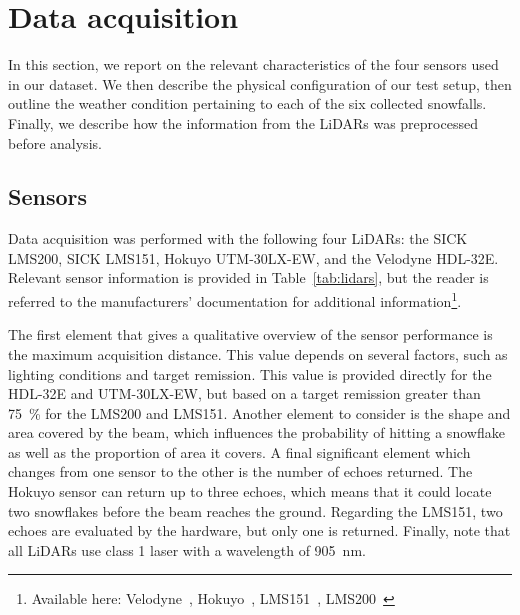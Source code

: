 \section{Data acquisition}
\label{sec:chap_lidar_data_acquisition}

In this section, we report on the relevant characteristics of the four sensors used in our dataset. We then describe the physical configuration of our test setup, then outline the weather condition pertaining to each of the six collected snowfalls. Finally, we describe how the information from the LiDARs was preprocessed before analysis.

\subsection{Sensors}

Data acquisition was performed with the following four LiDARs: the SICK LMS200, SICK LMS151, Hokuyo UTM-30LX-EW, and the Velodyne HDL-32E. Relevant sensor information is provided in Table~\ref{tab:lidars}, but the reader is referred to the manufacturers' documentation for additional information\footnote{Available here: Velodyne~\cite{VelodyneManual}, Hokuyo~\cite{UTMDatasheet}, LMS151~\cite{LMS151Datasheet}, LMS200~\cite{LMS200Manual}}.

The first element that gives a qualitative overview of the sensor performance is the maximum acquisition distance. This value depends on several factors, such as lighting conditions and target remission. This value is provided directly for the HDL-32E and UTM-30LX-EW, but based on a target remission greater than \SI{75}{\percent} for the LMS200 and LMS151. Another element to consider is the shape and area covered by the beam, which influences the probability of hitting a snowflake as well as the proportion of area it covers. A final significant element which changes from one sensor to the other is the number of echoes returned. The Hokuyo sensor can return up to three echoes, which means that it could locate two snowflakes before the beam reaches the ground. Regarding the LMS151, two echoes are evaluated by the hardware, but only one is returned. Finally, note that all LiDARs use class 1 laser with a wavelength of \SI{905}{\nano\meter}.

